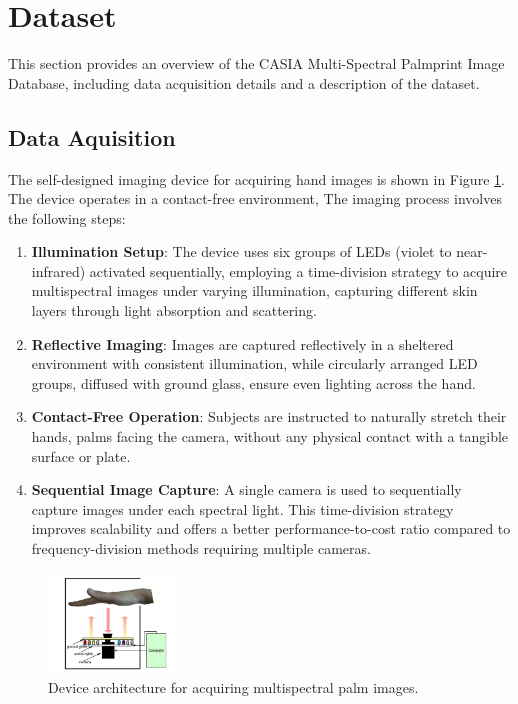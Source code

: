 \section{Dataset}
This section provides an overview of the CASIA Multi-Spectral Palmprint Image Database, including data acquisition details and a description of the dataset.

\subsection{Data Aquisition}

The self-designed imaging device for acquiring hand images \cite{hao2008multispectral,hao2007comparative} is shown in Figure \ref{fig:device_architecture}. The device operates in a contact-free environment, The imaging process involves the following steps:

\begin{enumerate}
    \item \textbf{Illumination Setup}: The device uses six groups of LEDs (violet to near-infrared) activated sequentially, employing a time-division strategy to acquire multispectral images under varying illumination, capturing different skin layers through light absorption and scattering. 
    \item \textbf{Reflective Imaging}: Images are captured reflectively in a sheltered environment with consistent illumination, while circularly arranged LED groups, diffused with ground glass, ensure even lighting across the hand. 
    \item \textbf{Contact-Free Operation}: Subjects are instructed to naturally stretch their hands, palms facing the camera, without any physical contact with a tangible surface or plate. 
    \item \textbf{Sequential Image Capture}: A single camera is used to sequentially capture images under each spectral light. This time-division strategy improves scalability and offers a better performance-to-cost ratio compared to frequency-division methods requiring multiple cameras.
\end{enumerate}

\begin{figure}[H]
    \centering
    \includegraphics[width=0.3\textwidth]{./images/device-architecture.png}
    \caption{Device architecture for acquiring multispectral palm images.}
    \label{fig:device_architecture}
\end{figure}

